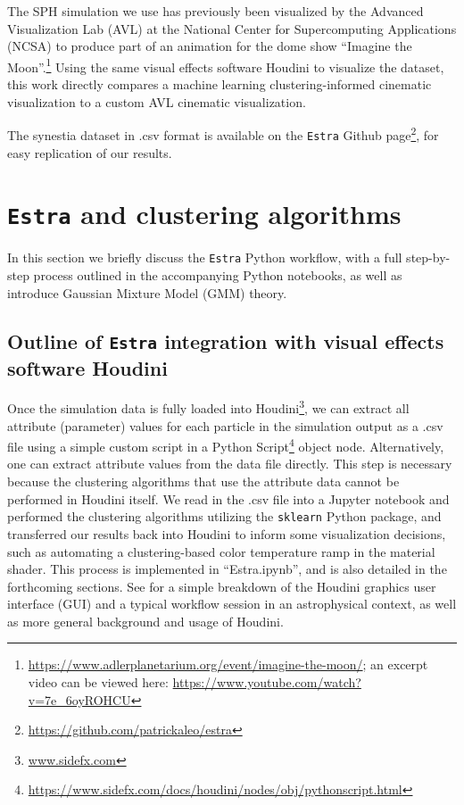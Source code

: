 \documentclass[fleqn,usenatbib,useAMS]{mnras}
\begin{document}
The SPH simulation we use has previously been visualized by the Advanced Visualization Lab (AVL) at the National Center for Supercomputing Applications (NCSA) to produce part of an animation for the dome show ``Imagine the Moon''.\footnote{\url{https://www.adlerplanetarium.org/event/imagine-the-moon/}; an excerpt video can be viewed here: \url{https://www.youtube.com/watch?v=7e_6oyROHCU}} Using the same visual effects software Houdini to visualize the dataset, this work directly compares a machine learning clustering-informed cinematic visualization to a custom AVL cinematic visualization.

The synestia dataset in .csv format is available on the \texttt{Estra} Github page\footnote{\url{https://github.com/patrickaleo/estra}}, for easy replication of our results. \par

\section{\texttt{Estra} and clustering algorithms}\label{sec:Estra}

In this section we briefly discuss the \texttt{Estra} Python workflow, with a full step-by-step process outlined in the accompanying Python notebooks, as well as introduce Gaussian Mixture Model (GMM) theory.

\subsection{Outline of \texttt{Estra} integration with visual effects software Houdini}

Once the simulation data is fully loaded into Houdini\footnote{\url{www.sidefx.com}}, we can extract all attribute (parameter) values for each particle in the simulation output as a .csv file using a simple custom script in a Python Script\footnote{\url{https://www.sidefx.com/docs/houdini/nodes/obj/pythonscript.html}} object node. Alternatively, one can extract attribute values from the data file directly. This step is necessary because the clustering algorithms that use the attribute data cannot be performed in Houdini itself. We read in the .csv file into a Jupyter notebook and performed the clustering algorithms utilizing the \texttt{sklearn} Python package, and transferred our results back into Houdini to inform some visualization decisions, such as automating a clustering-based color temperature ramp in the material shader. This process is implemented in ``Estra.ipynb'', and is also detailed in the forthcoming sections. See \cite{Naiman17} for a simple breakdown of the Houdini graphics user interface (GUI) and a typical workflow session in an astrophysical context, as well as more general background and usage of Houdini. \par
\end{document}
